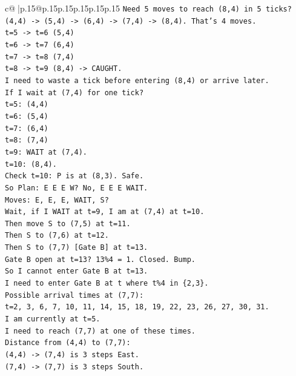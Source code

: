 \documentclass{article}
\begin{document}
{\begin{supertabular}{c@{$\;$}|p{.15\linewidth}@{}p{.15\linewidth}p{.15\linewidth}p{.15\linewidth}p{.15\linewidth}p{.15\linewidth}}
{{{\texttt{Need 5 moves to reach (8,4) in 5 ticks?} \\
\texttt{(4,4) {-}> (5,4) {-}> (6,4) {-}> (7,4) {-}> (8,4). That's 4 moves.} \\
\texttt{t=5 {-}> t=6 (5,4)} \\
\texttt{t=6 {-}> t=7 (6,4)} \\
\texttt{t=7 {-}> t=8 (7,4)} \\
\texttt{t=8 {-}> t=9 (8,4) {-}> CAUGHT.} \\
\texttt{I need to waste a tick before entering (8,4) or arrive later.} \\
\texttt{If I wait at (7,4) for one tick?} \\
\texttt{t=5: (4,4)} \\
\texttt{t=6: (5,4)} \\
\texttt{t=7: (6,4)} \\
\texttt{t=8: (7,4)} \\
\texttt{t=9: WAIT at (7,4).} \\
\texttt{t=10: (8,4).} \\
\texttt{Check t=10: P is at (8,3). Safe.} \\
\texttt{So Plan: E E E W? No, E E E WAIT.} \\
\texttt{Moves: E, E, E, WAIT, S?} \\
\texttt{Wait, if I WAIT at t=9, I am at (7,4) at t=10.} \\
\texttt{Then move S to (7,5) at t=11.} \\
\texttt{Then S to (7,6) at t=12.} \\
\texttt{Then S to (7,7) {[}Gate B{]} at t=13.} \\
\texttt{Gate B open at t=13? 13\%4 = 1. Closed. Bump.} \\
\texttt{So I cannot enter Gate B at t=13.} \\
\texttt{I need to enter Gate B at t where t\%4 in \{2,3\}.} \\
\texttt{Possible arrival times at (7,7):} \\
\texttt{t=2, 3, 6, 7, 10, 11, 14, 15, 18, 19, 22, 23, 26, 27, 30, 31.} \\
\texttt{I am currently at t=5.} \\
\texttt{I need to reach (7,7) at one of these times.} \\
\texttt{Distance from (4,4) to (7,7):} \\
\texttt{(4,4) {-}> (7,4) is 3 steps East.} \\
\texttt{(7,4) {-}> (7,7) is 3 steps South.} \\
}}}
\end{supertabular}}
\end{document}
